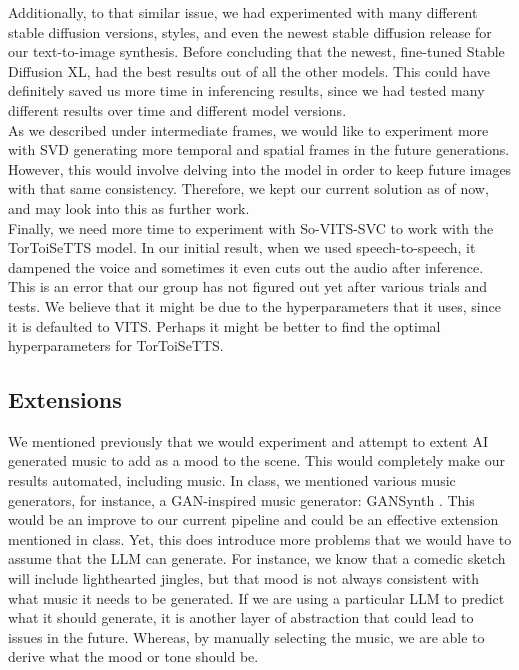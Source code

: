 \documentclass[conference]{IEEEtran}
\begin{document}
Additionally, to that similar issue, we had experimented with many different stable diffusion versions, styles, and even the newest stable diffusion release for our text-to-image synthesis. Before concluding that the newest, fine-tuned Stable Diffusion XL, had the best results out of all the other models. This could have definitely saved us more time in inferencing results, since we had tested many different results over time and different model versions. \\

As we described under intermediate frames, we would like to experiment more with SVD generating more temporal and spatial frames in the future generations. However, this would involve delving into the model in order to keep future images with that same consistency. Therefore, we kept our current solution as of now, and may look into this as further work. \\

Finally, we need more time to experiment with So-VITS-SVC to work with the TorToiSeTTS model. In our initial result, when we used speech-to-speech, it dampened the voice and sometimes it even cuts out the audio after inference. This is an error that our group has not figured out yet after various trials and tests. We believe that it might be due to the hyperparameters that it uses, since it is defaulted to VITS. Perhaps it might be better to find the optimal hyperparameters for TorToiSeTTS.

\subsection{Extensions}

We mentioned previously that we would experiment and attempt to extent AI generated music to add as a mood to the scene. This would completely make our results automated, including music. In class, we mentioned various music generators, for instance, a GAN-inspired music generator: GANSynth \cite{GANSynth}. This would be an improve to our current pipeline and could be an effective extension mentioned in class. Yet, this does introduce more problems that we would have to assume that the LLM can generate. For instance, we know that a comedic sketch will include lighthearted jingles, but that mood is not always consistent with what music it needs to be generated. If we are using a particular LLM to predict what it should generate, it is another layer of abstraction that could lead to issues in the future. Whereas, by manually selecting the music, we are able to derive what the mood or tone should be. \\
\end{document}
